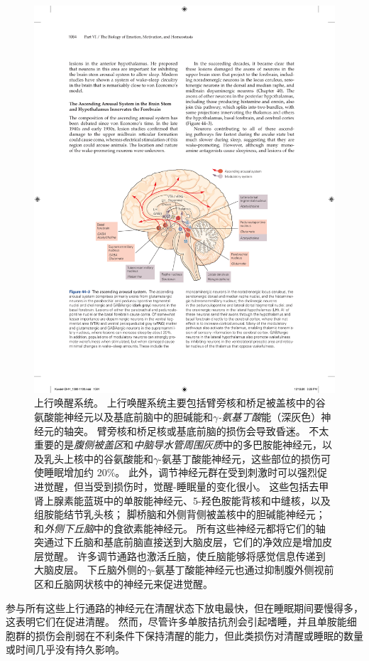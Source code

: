 \begin{figure}[htbp]
	\centering
	\includegraphics[width=0.94\linewidth]{chap44/fig_44_3}
	\caption{上行唤醒系统。
		上行唤醒系统主要包括臂旁核和桥足被盖核中的谷氨酸能神经元以及基底前脑中的胆碱能和\textit{$\gamma$-氨基丁酸}能（深灰色）神经元的轴突。
		臂旁核和桥足核或基底前脑的损伤会导致昏迷。
		不太重要的是\textit{腹侧被盖区}和\textit{中脑导水管周围灰质}中的多巴胺能神经元，以及乳头上核中的谷氨酸能和$\gamma$-氨基丁酸能神经元，这些部位的损伤可使睡眠增加约 20\%。
		此外，调节神经元群在受到刺激时可以强烈促进觉醒，但当受到损伤时，觉醒-睡眠量的变化很小。
		这些包括去甲肾上腺素能蓝斑中的单胺能神经元、5-羟色胺能背核和中缝核，以及组胺能结节乳头核；
		脚桥脑和外侧背侧被盖核中的胆碱能神经元；
		和\textit{外侧下丘脑}中的食欲素能神经元。
		所有这些神经元都将它们的轴突通过下丘脑和基底前脑直接送到大脑皮层，它们的净效应是增加皮层觉醒。
		许多调节通路也激活丘脑，使丘脑能够将感觉信息传递到大脑皮层。
		下丘脑外侧的$\gamma$-氨基丁酸能神经元也通过抑制腹外侧视前区和丘脑网状核中的神经元来促进觉醒。}
	\label{fig:44_3}
\end{figure}


参与所有这些上行通路的神经元在清醒状态下放电最快，但在睡眠期间要慢得多，这表明它们在促进清醒。
然而，尽管许多单胺拮抗剂会引起嗜睡，并且单胺能细胞群的损伤会削弱在不利条件下保持清醒的能力，但此类损伤对清醒或睡眠的数量或时间几乎没有持久影响。


